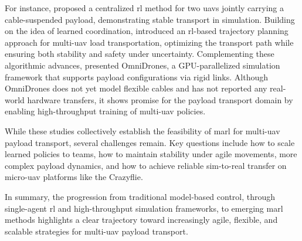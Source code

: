 For instance, \cite{Lin2024PayloadTW} proposed a centralized \gls{rl} method for two \glspl{uav} jointly carrying a cable-suspended payload, demonstrating stable transport in simulation. Building on the idea of learned coordination, \cite{Estevez2024Reinforcement} introduced an \gls{rl}-based trajectory planning approach for multi-\gls{uav} load transportation, optimizing the transport path while ensuring both stability and safety under uncertainty. Complementing these algorithmic advances, \cite{xu_omnidrones_2024} presented OmniDrones, a GPU-parallelized simulation framework that supports payload configurations via rigid links. Although OmniDrones does not yet model flexible cables and has not reported any real-world hardware transfers, it shows promise for the payload transport domain by enabling high-throughput training of multi-\gls{uav} policies.

While these studies collectively establish the feasibility of \gls{marl} for multi-\gls{uav} payload transport, several challenges remain. Key questions include how to scale learned policies to teams, how to maintain stability under agile movements, more complex payload dynamics, and how to achieve reliable sim-to-real transfer on micro-\gls{uav} platforms like the Crazyflie.

In summary, the progression from traditional model-based control, through single-agent \gls{rl} and high-throughput simulation frameworks, to emerging \gls{marl} methods highlights a clear trajectory toward increasingly agile, flexible, and scalable strategies for multi-\gls{uav} payload transport.
